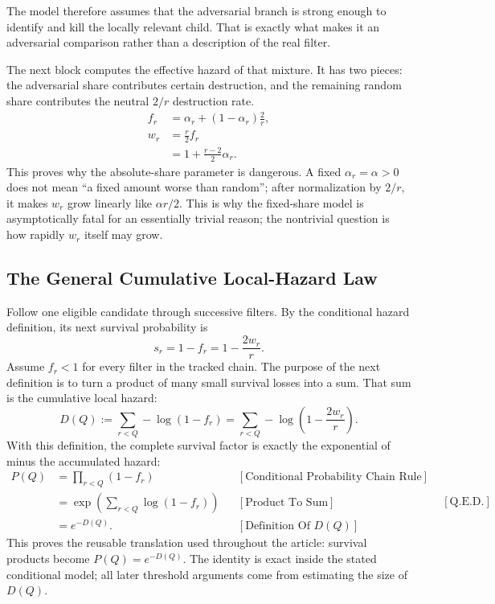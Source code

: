 The model therefore assumes that the adversarial branch is strong enough to identify and kill the locally relevant child. That is exactly what makes it an adversarial comparison rather than a description of the real filter.

The next block computes the effective hazard of that mixture. It has two pieces: the adversarial share contributes certain destruction, and the remaining random share contributes the neutral $2/r$ destruction rate.
\begin{equation*}
\begin{aligned}
f_r
&=\alpha_r+(1-\alpha_r)\frac2r,\\
w_r
&=\frac r2f_r\\
&=1+\frac{r-2}{2}\alpha_r.
\end{aligned}
\end{equation*}
This proves why the absolute-share parameter is dangerous. A fixed $\alpha_r=\alpha>0$ does not mean ``a fixed amount worse than random''; after normalization by $2/r$, it makes $w_r$ grow linearly like $\alpha r/2$. This is why the fixed-share model is asymptotically fatal for an essentially trivial reason; the nontrivial question is how rapidly $w_r$ itself may grow.
\subsection{The General Cumulative Local-Hazard Law}
Follow one eligible candidate through successive filters. By the conditional hazard definition, its next survival probability is
\begin{equation*}
s_r=1-f_r=1-\frac{2w_r}{r}.
\end{equation*}
Assume $f_r < 1$ for every filter in the tracked chain. The purpose of the next definition is to turn a product of many small survival losses into a sum. That sum is the cumulative local hazard:
\begin{equation*}
D(Q)
:=\sum_{r < Q}-\log(1-f_r)
=\sum_{r < Q}-\log\left(1-\frac{2w_r}{r}\right).
\end{equation*}
With this definition, the complete survival factor is exactly the exponential of minus the accumulated hazard:
\begin{equation*}
\begin{aligned}
P(Q)
&=\prod_{r < Q}(1-f_r)
&&[\text{Conditional Probability Chain Rule}]\\
&=\exp\left(\sum_{r < Q}\log(1-f_r)\right)
&&[\text{Product To Sum}]\\
&=e^{-D(Q)}.
&&[\text{Definition Of }D(Q)]
\end{aligned}
\qquad[\text{Q.E.D.}]
\end{equation*}
This proves the reusable translation used throughout the article: survival products become $P(Q)=e^{-D(Q)}$. The identity is exact inside the stated conditional model; all later threshold arguments come from estimating the size of $D(Q)$.

